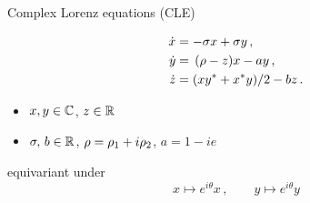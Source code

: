 \begin{frame}{Complex Lorenz equations (CLE)}
  \begin{exampleblock}{}
	\begin{align*}
	  \dot{x} &= -\sigma x+ \sigma y \,,\nonumber \\ 
	  \dot{y} &=\, (\rho-z)x-a y\,, \nonumber \\ 
	  \dot{z} &= (x y^*+x^*y)/2 -b z\,.
	\end{align*}
  \end{exampleblock}
  \begin{block}{}
     \begin{itemize}
	  \item $x,y\in\mathbb{C}^{}$, $z\in\mathbb{R}^{}$
	  \item $\sigma,\,b \in \mathbb{R}^{}$, $\rho=\rho_1+i\rho_2$, $a=1-i e$
	  \end{itemize}
  \end{block}
  \begin{block}{equivariant under}
    \[
      x\mapsto e^{i\theta}x\,, \qquad y\mapsto e^{i\theta}y
    \]
  \end{block}
\end{frame}


